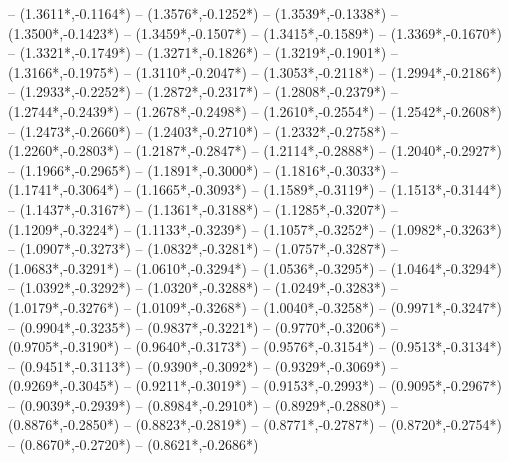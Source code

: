 {	-- ({1.3611*\dx},{-0.1164*\dy})
	-- ({1.3576*\dx},{-0.1252*\dy})
	-- ({1.3539*\dx},{-0.1338*\dy})
	-- ({1.3500*\dx},{-0.1423*\dy})
	-- ({1.3459*\dx},{-0.1507*\dy})
	-- ({1.3415*\dx},{-0.1589*\dy})
	-- ({1.3369*\dx},{-0.1670*\dy})
	-- ({1.3321*\dx},{-0.1749*\dy})
	-- ({1.3271*\dx},{-0.1826*\dy})
	-- ({1.3219*\dx},{-0.1901*\dy})
	-- ({1.3166*\dx},{-0.1975*\dy})
	-- ({1.3110*\dx},{-0.2047*\dy})
	-- ({1.3053*\dx},{-0.2118*\dy})
	-- ({1.2994*\dx},{-0.2186*\dy})
	-- ({1.2933*\dx},{-0.2252*\dy})
	-- ({1.2872*\dx},{-0.2317*\dy})
	-- ({1.2808*\dx},{-0.2379*\dy})
	-- ({1.2744*\dx},{-0.2439*\dy})
	-- ({1.2678*\dx},{-0.2498*\dy})
	-- ({1.2610*\dx},{-0.2554*\dy})
	-- ({1.2542*\dx},{-0.2608*\dy})
	-- ({1.2473*\dx},{-0.2660*\dy})
	-- ({1.2403*\dx},{-0.2710*\dy})
	-- ({1.2332*\dx},{-0.2758*\dy})
	-- ({1.2260*\dx},{-0.2803*\dy})
	-- ({1.2187*\dx},{-0.2847*\dy})
	-- ({1.2114*\dx},{-0.2888*\dy})
	-- ({1.2040*\dx},{-0.2927*\dy})
	-- ({1.1966*\dx},{-0.2965*\dy})
	-- ({1.1891*\dx},{-0.3000*\dy})
	-- ({1.1816*\dx},{-0.3033*\dy})
	-- ({1.1741*\dx},{-0.3064*\dy})
	-- ({1.1665*\dx},{-0.3093*\dy})
	-- ({1.1589*\dx},{-0.3119*\dy})
	-- ({1.1513*\dx},{-0.3144*\dy})
	-- ({1.1437*\dx},{-0.3167*\dy})
	-- ({1.1361*\dx},{-0.3188*\dy})
	-- ({1.1285*\dx},{-0.3207*\dy})
	-- ({1.1209*\dx},{-0.3224*\dy})
	-- ({1.1133*\dx},{-0.3239*\dy})
	-- ({1.1057*\dx},{-0.3252*\dy})
	-- ({1.0982*\dx},{-0.3263*\dy})
	-- ({1.0907*\dx},{-0.3273*\dy})
	-- ({1.0832*\dx},{-0.3281*\dy})
	-- ({1.0757*\dx},{-0.3287*\dy})
	-- ({1.0683*\dx},{-0.3291*\dy})
	-- ({1.0610*\dx},{-0.3294*\dy})
	-- ({1.0536*\dx},{-0.3295*\dy})
	-- ({1.0464*\dx},{-0.3294*\dy})
	-- ({1.0392*\dx},{-0.3292*\dy})
	-- ({1.0320*\dx},{-0.3288*\dy})
	-- ({1.0249*\dx},{-0.3283*\dy})
	-- ({1.0179*\dx},{-0.3276*\dy})
	-- ({1.0109*\dx},{-0.3268*\dy})
	-- ({1.0040*\dx},{-0.3258*\dy})
	-- ({0.9971*\dx},{-0.3247*\dy})
	-- ({0.9904*\dx},{-0.3235*\dy})
	-- ({0.9837*\dx},{-0.3221*\dy})
	-- ({0.9770*\dx},{-0.3206*\dy})
	-- ({0.9705*\dx},{-0.3190*\dy})
	-- ({0.9640*\dx},{-0.3173*\dy})
	-- ({0.9576*\dx},{-0.3154*\dy})
	-- ({0.9513*\dx},{-0.3134*\dy})
	-- ({0.9451*\dx},{-0.3113*\dy})
	-- ({0.9390*\dx},{-0.3092*\dy})
	-- ({0.9329*\dx},{-0.3069*\dy})
	-- ({0.9269*\dx},{-0.3045*\dy})
	-- ({0.9211*\dx},{-0.3019*\dy})
	-- ({0.9153*\dx},{-0.2993*\dy})
	-- ({0.9095*\dx},{-0.2967*\dy})
	-- ({0.9039*\dx},{-0.2939*\dy})
	-- ({0.8984*\dx},{-0.2910*\dy})
	-- ({0.8929*\dx},{-0.2880*\dy})
	-- ({0.8876*\dx},{-0.2850*\dy})
	-- ({0.8823*\dx},{-0.2819*\dy})
	-- ({0.8771*\dx},{-0.2787*\dy})
	-- ({0.8720*\dx},{-0.2754*\dy})
	-- ({0.8670*\dx},{-0.2720*\dy})
	-- ({0.8621*\dx},{-0.2686*\dy})
}
